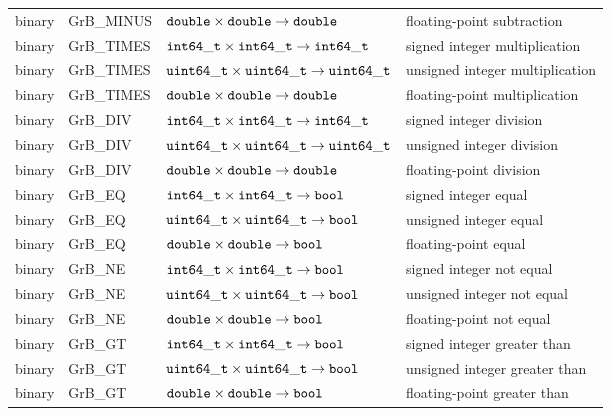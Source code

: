 \documentclass[11pt]{extarticle}
\begin{document}
\begin{table}
\begin{center}
\begin{tabular}{l|l|l|l}
binary		& {\sf GrB\_MINUS}	& ${\tt double} \times {\tt double} \rightarrow {\tt double}$ 		& floating-point subtraction \\
binary		& {\sf GrB\_TIMES}	& ${\tt int64\_t} \times {\tt int64\_t} \rightarrow {\tt int64\_t}$ 	& signed integer multiplication \\
binary		& {\sf GrB\_TIMES}	& ${\tt uint64\_t} \times {\tt uint64\_t} \rightarrow {\tt uint64\_t}$ 	& unsigned integer multiplication \\
binary		& {\sf GrB\_TIMES}	& ${\tt double} \times {\tt double} \rightarrow {\tt double}$ 		& floating-point multiplication \\
binary		& {\sf GrB\_DIV}	& ${\tt int64\_t} \times {\tt int64\_t} \rightarrow {\tt int64\_t}$ 	& signed integer division \\
binary		& {\sf GrB\_DIV}	& ${\tt uint64\_t} \times {\tt uint64\_t} \rightarrow {\tt uint64\_t}$ 	& unsigned integer division \\
binary		& {\sf GrB\_DIV}	& ${\tt double} \times {\tt double} \rightarrow {\tt double}$ 		& floating-point division \\
binary		& {\sf GrB\_EQ}		& ${\tt int64\_t} \times {\tt int64\_t} \rightarrow {\tt bool}$		& signed integer  equal \\
binary		& {\sf GrB\_EQ}		& ${\tt uint64\_t} \times {\tt uint64\_t} \rightarrow {\tt bool}$ 	& unsigned integer  equal \\
binary		& {\sf GrB\_EQ}		& ${\tt double} \times {\tt double} \rightarrow {\tt bool}$ 		& floating-point  equal \\
binary		& {\sf GrB\_NE}		& ${\tt int64\_t} \times {\tt int64\_t} \rightarrow {\tt bool}$		& signed integer not equal \\
binary		& {\sf GrB\_NE}		& ${\tt uint64\_t} \times {\tt uint64\_t} \rightarrow {\tt bool}$ 	& unsigned integer not equal \\
binary		& {\sf GrB\_NE}		& ${\tt double} \times {\tt double} \rightarrow {\tt bool}$ 		& floating-point not equal \\
binary		& {\sf GrB\_GT}		& ${\tt int64\_t} \times {\tt int64\_t} \rightarrow {\tt bool}$		& signed integer greater than  \\
binary		& {\sf GrB\_GT}		& ${\tt uint64\_t} \times {\tt uint64\_t} \rightarrow {\tt bool}$ 	& unsigned integer greater than  \\
binary		& {\sf GrB\_GT}		& ${\tt double} \times {\tt double} \rightarrow {\tt bool}$ 		& floating-point greater than  \\

\end{tabular}
\end{center}
\end{table}
\end{document}
